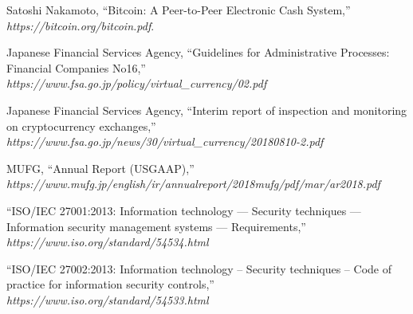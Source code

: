 \documentclass[english]{llncs}
\begin{document}
\begin{thebibliography}{21}
 Satoshi Nakamoto, ``Bitcoin: A Peer-to-Peer Electronic Cash System,'' \textit{https://bitcoin.org/bitcoin.pdf}.



Japanese Financial Services Agency, ``Guidelines for Administrative Processes: Financial Companies No16,''
\textit{https://www.fsa.go.jp/policy/virtual\_currency/02.pdf}

Japanese Financial Services Agency, ``Interim report of inspection and monitoring on cryptocurrency exchanges,''
\textit{https://www.fsa.go.jp/news/30/virtual\_currency/20180810-2.pdf}

MUFG, ``Annual Report (USGAAP),''\\
\textit{https://www.mufg.jp/english/ir/annualreport/2018mufg/pdf/mar/ar2018.pdf}

``ISO/IEC 27001:2013: Information technology — Security techniques — Information security management systems — Requirements,''  \\
\textit{https://www.iso.org/standard/54534.html}

``ISO/IEC 27002:2013: Information technology -- Security techniques -- Code of practice for information security controls,''  \\
\textit{https://www.iso.org/standard/54533.html}

\end{thebibliography}

\begin{subappendices}



\end{subappendices}
\end{document}
